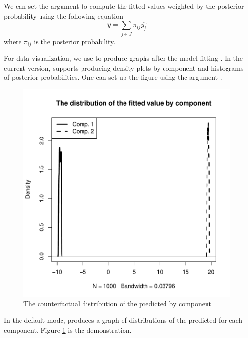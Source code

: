\documentclass[nojss]{jss}
\begin{document}
We can set the argument  to compute the fitted values weighted by the posterior probability using the following equation:
\begin{equation}
\hat{y} = \sum_{j \in J} \pi_{ij} \hat{y_j} 
\end{equation}
where $\pi_{ij}$ is the posterior probability. 

For data visualization, we use  to produce graphs after the model fitting . In the current version,  supports producing density plots by component and histograms of posterior probabilities. One can set up the figure using the argument . 

\begin{figure}[htp]
\caption{The counterfactual distribution of the predicted by component}
\label{fig:plot1}
\centering
\includegraphics{em_intro-004}
\end{figure}
In the default mode,  produces a graph of distributions of the predicted for each component. Figure \ref{fig:plot1} is the demonstration. 
\end{document}
